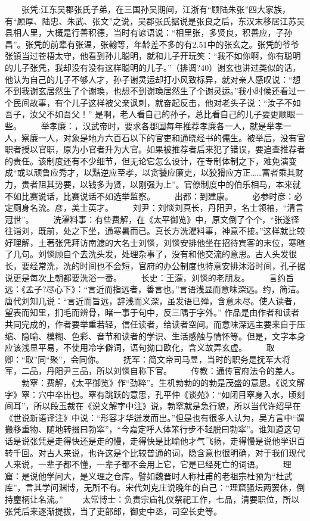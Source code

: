 \documentclass[]{book}
\begin{document}
　　张凭:江东吴郡张氏子弟，在三国孙吴期间，江浙有``顾陆朱张''四大家族，有``顾厚、陆忠、朱武、张文''之说，吴郡张氏据说是张良之后，东汉末移居江苏吴县相人里，大概是行善积德，当时有谚语说：``相里张，多贤良，积善应，子孙昌''。张凭的前辈有张温，张翰等，年龄差不多的有2.51中的张玄之。张凭的爷爷张镇当过苍梧太守，他看到孙儿聪明，就和儿子开玩笑：``我不如你啊，你有聪明的儿子张凭，我却没有没有这样聪明的儿子。''（排调?40）谢玄也讲过类似的话，他认为自己的儿子不够人才，孙子谢灵运却打小风致标异，就对亲人感叹说：``想不到我谢玄居然生了个谢瑍，也想不到谢瑍居然生了个谢灵运。''我小时候还看过一个民间故事，有个儿子这样被父亲讽刺，就奋起反击，他对老头子说：``汝子不如吾子，汝父不如吾父！''
是啊，老人看自己的孙子，总比看自己的儿子要更顺眼一些。
　　举孝廉：，汉武帝时，要求各郡国每年推荐孝廉各一人，就是举孝一人，察廉一人，对象是地方六百石以下的官吏和通晓经书的儒生。被举后，没有官职者授以官职，原为小官者升为大官。如果被推荐者后来犯了错误，要追查推荐者的责任。该制度还有不少细节，但无论它怎么设计，在专制体制之下，难免演变成``或以顽鲁应秀才，以黠逆应至孝，以贪饕应廉吏，以狡猾应方正\ldots{}\ldots{}富者乘其财力，贵者阻其势要，以钱多为贤，以刚强为上''。官僚制度中的伯乐相马，本来就不如比赛说话，比赛说话不如选举监察。
　　出都：到建康。 　　必参时彦：必定厕身名流。彦，美士英才。
　　刘尹：刘惔刘真长，丹阳尹，名士领袖，``清言冠世''。
　　洗濯料事：有些费解，在《太平御览》中，原文倒了个个，``张遂径往诣刘，既前，处之下坐，通寒暑而已。真长方洗濯料事，神意不接。''这样就比较好理解，土著张凭拜访南渡的大名士刘惔，刘惔安排他坐在招待宾客的末位，寒暄了几句。刘惔顾自个去洗头发，处理杂事了，没有和他交流的意思。古人头发很长，要经常洗，洗的时间也不会短，官府的办公制度也特意安排沐浴时间，孔子据说更是每次上朝都要洗浴一番。
　　长史：王濛，刘惔的老朋友。
　　言约旨远：《孟子?尽心下》：``言近而指远者，善言也。''言语浅显而意味深远。约，简洁。唐代刘知几说：``言近而旨远，辞浅而义深，虽发语已殚，含意未尽。使人读者，望表而知里，扪毛而辨骨，睹一事于句中，反三隅于字外。''
作品是由作者和读者共同完成的，作者要举重若轻，信任读者，给读者空间。而意味深远主要来自于压缩、隐喻、模糊、色彩、音节和读者的学识、生活感触与情怀等。但是，文字本身应该浅显平易，不使用冷字僻词，语句拗口欧化，含义故弄玄虚。
　　取卿：``取''同``聚''，会同你。
　　抚军：简文帝司马昱，当时的职务是抚军大将军，二品，丹阳尹三品，所以刘惔自称下官。
　　传教：通传官府法令的差人。
　　勃窣：费解，《太平御览》作``劲粹''。生机勃勃的的勃是茂盛的意思。《说文解字》窣：穴中卒出也。窣有跳跃的意思，孔平仲《谈苑》：``如闭目窣身入水，顷刻间耳''，所以段玉裁在《说文解字中注》说，勃窣就是急行貌，所以当代许绍早在《世说新语译注》中说：``形容才华迸发而出。''但是也有很多人认为，吴方言中``谓搬移重物、随地转掇曰勃窣''，``今嘉定呼人体笨行步不轻脱曰勃窣''。谁知道这句话是说张凭是走得快还是走的慢，走得快是比喻他才气飞扬，走得慢是说他学识百转千回。对古人来说，也许这是个比较普通的词，隐含意也很明确，对于我们现代人来说，一辈子都不懂，一辈子都不会用上它，它是已经死亡的词语。
　　理窟：是说他学问大，是义理之仓库。譬如魏晋时人称杜甫的老祖宗杜预为``杜武库''，言其学问渊博，无所不有。宋代刘克庄说晚年的自己：``理窟骚坛两罢休，倒持麈柄让名流。''
　　太常博士：负责宗庙礼仪祭祀工作，七品，清要职位，所以张凭后来逐渐提拔，当了吏部郎，御史中丞，司空长史等。
\end{document}
